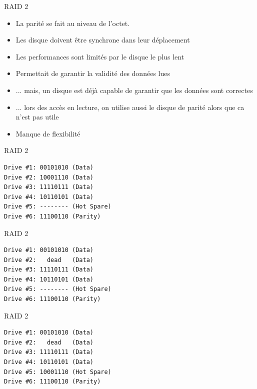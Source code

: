 \begin{frame}[fragile=singleslide]{RAID 2}
  \begin{itemize} 
  \item La parité se fait au niveau de l'octet.
  \item Les disque doivent être synchrone dans leur déplacement
  \item Les performances sont limités par le disque le plus lent
  \item Permettait de garantir la validité des données lues
  \item  ... mais,  un disque  est déjà  capable de  garantir  que les
    données sont correctes
  \item ... lors  des accès en lecture, on utilise  aussi le disque de
    parité alors que ca n'est pas utile
  \item Manque de flexibilité
  \end{itemize} 
\end{frame}

\begin{frame}[fragile=singleslide]{RAID 2}
\begin{lstlisting} 
Drive #1: 00101010 (Data)
Drive #2: 10001110 (Data)
Drive #3: 11110111 (Data)
Drive #4: 10110101 (Data)
Drive #5: -------- (Hot Spare)
Drive #6: 11100110 (Parity)
\end{lstlisting} 
\end{frame}

\begin{frame}[fragile=singleslide]{RAID 2}
\begin{lstlisting} 
Drive #1: 00101010 (Data)
Drive #2:   dead   (Data)
Drive #3: 11110111 (Data)
Drive #4: 10110101 (Data)
Drive #5: -------- (Hot Spare)
Drive #6: 11100110 (Parity)
\end{lstlisting} 
\end{frame}

\begin{frame}[fragile=singleslide]{RAID 2}
\begin{lstlisting} 
Drive #1: 00101010 (Data)
Drive #2:   dead   (Data)
Drive #3: 11110111 (Data)
Drive #4: 10110101 (Data)
Drive #5: 10001110 (Hot Spare)
Drive #6: 11100110 (Parity)
\end{lstlisting} 
\end{frame} 

